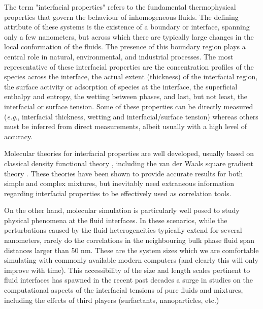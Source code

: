 \documentclass[9pt,tutorial]{livecoms}
\begin{document}
The term "interfacial properties" refers to the fundamental thermophysical
properties that govern the behaviour of inhomogeneous fluids. The defining
attribute of these systems is the existence of a boundary or interface,
spanning only a few nanometers, but across which there are typically large
changes in the local conformation of the fluids. The presence of this boundary
region plays a central role in natural, environmental, and industrial
processes. The most representative of these interfacial properties are the
concentration profiles of the species across the interface, the actual extent
(thickness) of the interfacial region, the surface activity or adsorption of
species at the interface, the superficial enthalpy and entropy, the wetting
between phases, and last, but not least, the interfacial or surface tension.
Some of these properties can be directly measured (\textit{e.g}., interfacial
thickness, wetting and interfacial/surface tension) \citep{evans2006}
whereas others must be inferred from direct measurements, albeit
usually with a high level of accuracy. 

Molecular theories for interfacial properties are well developed, usually based
on classical density functional theory \citep{evans1992,rowlinson1982}, including the van der Waals square gradient
theory \citep{davis1982,rowlinson1982}.
These theories have been shown to provide accurate results for both simple and
complex mixtures, but inevitably need extraneous information regarding
interfacial properties to be effectively used as correlation tools.

On the other hand, molecular simulation is particularly well posed to study
physical phenomena at the fluid interfaces. In these scenarios, while the
perturbations caused by the fluid heterogeneities typically extend for several
nanometers, rarely do the correlations in the neighbouring bulk phase fluid
span distances larger than 50 nm. These are the system sizes which we are
comfortable simulating with commonly available modern computers (and
clearly this will only improve with time). This accessibility of the size and
length scales pertinent to fluid interfaces has spawned in the recent past decades a surge in studies
on the computational aspects of the interfacial
tensions of pure fluids and mixtures, including the effects of third players
(surfactants, nanoparticles, etc.) 
\end{document}
